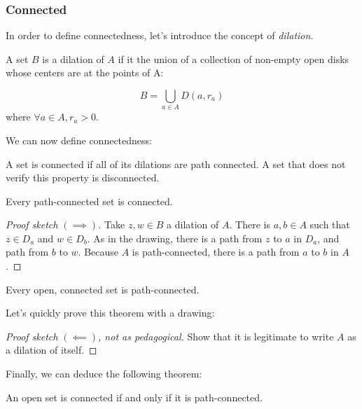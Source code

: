 \subsubsection{Connected}
In order to define connectedness, let's introduce the concept of \emph{dilation}.

\begin{defi}[Dilation]
    A set $B$ is a dilation of $A$ if it the union of a collection of non-empty open disks whose centers are at the points of A:

    $$ B = \bigcup_{a\in A}{D(a, r_a)} $$
    where $\forall a\in A, r_a > 0$.
\end{defi}

We can now define connectedness:

\begin{defi}
    A set is connected if all of its dilations are path connected. A set that does not verify this property is disconnected.
\end{defi}

\begin{thm*}
    Every path-connected set is connected.
\end{thm*}

\begin{proof}[Proof sketch $(\implies)$]
    Take $z, w \in B$ a dilation of $A$. There is $a, b \in A$ such that $z\in D_a$ and $w\in D_b$.
    As in the drawing, there is a path from $z$ to $a$ in $D_a$, and path from $b$ to $w$. Because $A$ is path-connected, there is a path from $a$ to $b$ in $A$. 
\end{proof}

\begin{thm*}
    Every open, connected set is path-connected.
\end{thm*}

Let's quickly prove this theorem with a drawing:

\begin{proof}[Proof sketch $(\impliedby)$, not as pedagogical]
    Show that it is legitimate to write $A$ as a dilation of itself.
\end{proof}

Finally, we can deduce the following theorem:

\begin{thm*}
   An open set is connected if and only if it is path-connected. 
\end{thm*}

